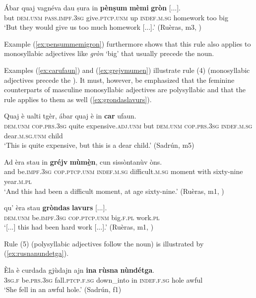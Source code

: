 \ea
\label{ex:pensummemigron}
\gll  Ábar quaj vagnéva dau ṣura in \textbf{pènṣum} \textbf{mèmi} \textbf{gròn} [...].  \\
but \textsc{dem.unm} \textsc{pass.impf.3sg} give.\textsc{ptcp.unm} up \textsc{indef.m.sg} homework too big\\
\glt `But they would give us too much homework [...].' (Ruèras, m3, )
\z

Example (\ref{ex:pensummemigron}) furthermore shows that this rule also applies to monosyllabic adjectives like \textit{gròn} `big' that usually precede the noun.

Examples (\ref{ex:carufaun}) and (\ref{ex:grejvmumen}) illustrate rule (4) (monosyllabic adjectives precede the ). It must, however, be emphasized that the feminine counterparts of masculine monosyllabic adjectives are polysyllabic and that the rule applies to them as well (\ref{ex:grondaslavurs}).

\ea
\label{ex:carufaun}
\gll Quaj è ualti tgèr, ábar quaj è in \textbf{car} ufaun.\\
\textsc{dem.unm} \textsc{cop.prs.3sg} quite expensive.\textsc{adj.unm} but \textsc{dem.unm} \textsc{cop.prs.3sg} \textsc{indef.m.sg} dear.\textsc{m.sg.unm} child\\
\glt `This is quite expensive, but this is a dear child.' (Sadrún, m5)
\z 

\ea
\label{ex:grejvmumen}
\gll    Ad èra stau in \textbf{gréjv} \textbf{mùm{\`e̱}n}, cun sissòntanùv òns.\\
and be.\textsc{impf.3sg} \textsc{cop.ptcp.unm} \textsc{indef.m.sg} difficult.\textsc{m.sg} moment with sixty-nine year.\textsc{m.pl} \\
\glt `And this had been a difficult moment, at age sixty-nine.' (Ruèras, m1, )
\z 

\ea
\label{ex:grondaslavurs}
\gll [...] qu’ èra stau \textbf{gròndas} \textbf{lavurs} [...].\\
{} \textsc{dem.unm} be.\textsc{impf.3sg} \textsc{cop.ptcp.unm} big.\textsc{f.pl} work.\textsc{pl}\\
\glt `[...] this had been hard work [...].' (Ruèras, m1, )
\z

Rule (5) (polysyllabic adjectives follow the noun) is illustrated by (\ref{ex:rusnanundetga}).

\ea
\label{ex:rusnanundetga}
\gll  Èla è curdada gjùdajn ajn \textbf{ina} \textbf{rùsna} \textbf{nùndétga}.  \\
\textsc{3sg.f} be.\textsc{prs.3sg} fall.\textsc{ptcp.f.sg} down\_into in \textsc{indef.f.sg} hole awful\\
\glt `She fell in an awful hole.' (Sadrún, f1)
\z

